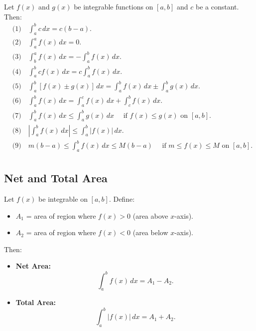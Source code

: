 \documentclass[a4paper,11pt]{article}
\theoremstyle{definition}
\theoremstyle{plain}
\theoremstyle{remark}
\begin{document}
\begin{tcolorbox}[breakable]
    Let $f(x)$ and $g(x)$ be integrable functions on $[a,b]$ and $c$ be a constant. Then:
    \[
    \begin{aligned}
        &\text{(1)} \quad \int_{a}^{b}c \, dx = c(b-a). \\[8pt]
        &\text{(2)} \quad \int_{a}^{a}f(x) \, dx = 0. \\[8pt]
        &\text{(3)} \quad \int_{b}^{a}f(x) \, dx = -\int_{a}^{b}f(x) \, dx. \\[8pt]
        &\text{(4)} \quad \int_{a}^{b}cf(x) \, dx = c \int_{a}^{b}f(x) \, dx. \\[8pt]
        &\text{(5)} \quad \int_{a}^{b}\left[f(x) \pm g(x)\right] \, dx = \int_{a}^{b}f(x) \, dx \pm \int_{a}^{b}g(x) \, dx. \\[8pt]
        &\text{(6)} \quad \int_{a}^{b}f(x) \, dx = \int_{a}^{c}f(x) \, dx + \int_{c}^{b}f(x) \, dx. \\[8pt]
        &\text{(7)} \quad \int_{a}^{b}f(x) \, dx \leq \int_{a}^{b}g(x) \, dx \quad \text{ if } f(x) \leq g(x) \text{ on } [a,b]. \\[8pt]
        &\text{(8)} \quad \left| \int_{a}^{b}f(x) \, dx \right| \leq \int_{a}^{b} \left|f(x)\right| \, dx. \\[8pt]
        &\text{(9)} \quad m(b-a) \leq \int_{a}^{b}f(x) \, dx \leq M(b-a) \quad \text{ if } m \leq f(x) \leq M \text{ on } [a,b]. \\[8pt]
    \end{aligned}
    \]
\end{tcolorbox}




\subsection{Net and Total Area}

\begin{tcolorbox}
    Let $f(x)$ be integrable on $[a,b]$. Define:
    \begin{itemize}
        \item $A_1$ = area of region where $f(x) > 0$ (area above $x$-axis).
        \item $A_2$ = area of region where $f(x) < 0$ (area below $x$-axis).
    \end{itemize}
    Then:
    \begin{itemize}
        \item \textbf{Net Area:}
        \[
        \int_{a}^{b} f(x) \, dx = A_1 - A_2.
        \]
        \item \textbf{Total Area:}
        \[
        \int_{a}^{b} \left| f(x) \right| \, dx = A_1 + A_2.
        \]
    \end{itemize}
\end{tcolorbox}
\end{document}
